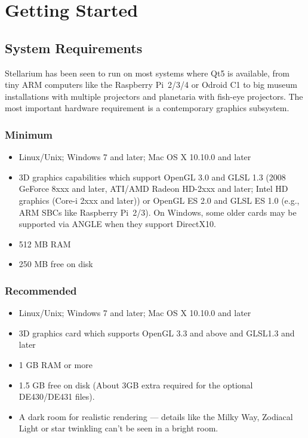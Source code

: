 

\chapter{Getting Started}
\label{ch:GettingStarted}

\section{System Requirements}
\label{sec:GettingStarted:SystemRequirements}

Stellarium has been seen to run on most systems where Qt5 is
available, from tiny ARM computers like the Raspberry Pi~2/3/4
or Odroid C1 to big museum installations with multiple projectors 
and planetaria with fish-eye projectors. 
The most important hardware requirement is a contemporary graphics subsystem.


\subsection{Minimum}
\begin{itemize}
\item Linux/Unix; Windows 7 and later; Mac OS X 10.10.0 and later
\item 3D graphics capabilities which support OpenGL 3.0 and GLSL 1.3 (2008
  GeForce 8xxx and later, ATI/AMD Radeon HD-2xxx and later; Intel HD
  graphics (Core-i 2xxx and later)) or OpenGL ES 2.0 and GLSL ES 1.0
  (e.g., ARM SBCs like Raspberry Pi~2/3). On Windows, some older cards
  may be supported via ANGLE when they support DirectX10.
\item 512 MB RAM
\item 250 MB free on disk
\end{itemize}

\subsection{Recommended}
\begin{itemize}
\item Linux/Unix; Windows 7 and later; Mac OS X 10.10.0 and later
\item 3D graphics card which supports OpenGL 3.3 and above and GLSL1.3 and later
\item 1 GB RAM or more
\item 1.5 GB free on disk (About 3GB extra required for the optional DE430/DE431 files).
\item A dark room for realistic rendering --- details like the Milky Way, Zodiacal Light 
      or star twinkling can't be seen in a bright room.
\end{itemize}


